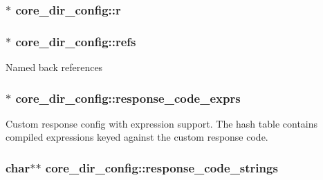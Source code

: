 \subsubsection[{\texorpdfstring{r}{r}}]{$\ast$ core\+\_\+dir\+\_\+config\+::r}\hypertarget{structcore__dir__config_a98b6e5c0009c0cb45b8cecc78819a3f8}{}\label{structcore__dir__config_a98b6e5c0009c0cb45b8cecc78819a3f8}
\subsubsection[{\texorpdfstring{refs}{refs}}]{$\ast$ core\+\_\+dir\+\_\+config\+::refs}\hypertarget{structcore__dir__config_a7f01bab182d2e7f11b466afced7f24f4}{}\label{structcore__dir__config_a7f01bab182d2e7f11b466afced7f24f4}
Named back references 
\subsubsection[{\texorpdfstring{response\+\_\+code\+\_\+exprs}{response_code_exprs}}]{$\ast$ core\+\_\+dir\+\_\+config\+::response\+\_\+code\+\_\+exprs}\hypertarget{structcore__dir__config_a1fab962a8a35689fc897b2aac77b935e}{}\label{structcore__dir__config_a1fab962a8a35689fc897b2aac77b935e}
Custom response config with expression support. The hash table contains compiled expressions keyed against the custom response code. 
\subsubsection[{\texorpdfstring{response\+\_\+code\+\_\+strings}{response_code_strings}}]{\setlength{\rightskip}{0pt plus 5cm}char$\ast$$\ast$ core\+\_\+dir\+\_\+config\+::response\+\_\+code\+\_\+strings}\hypertarget{structcore__dir__config_a65e930e6055967b5ef44484b7f001a0f}{}\label{structcore__dir__config_a65e930e6055967b5ef44484b7f001a0f}
